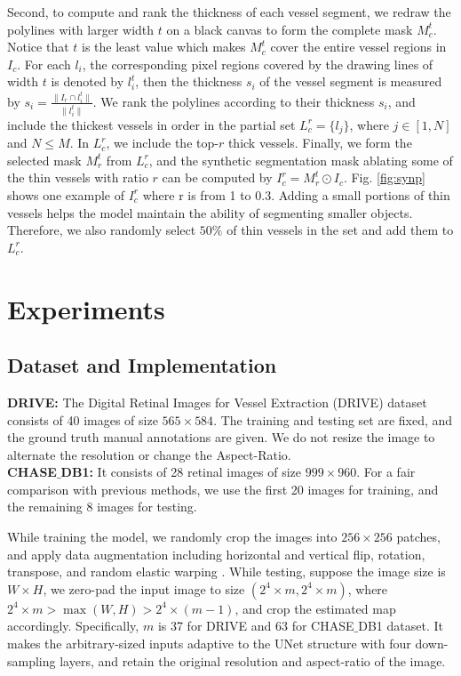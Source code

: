 \documentclass[runningheads]{llncs}
\begin{document}
Second, to compute and rank the thickness of each vessel segment, we redraw the polylines with larger width $t$ on a black canvas to form the complete mask $M_c^t$. Notice that $t$ is the least value which makes $M_c^t$ cover the entire vessel regions in $I_c$. For each $l_i$, the corresponding pixel regions covered by the drawing lines of width $t$ is denoted by $l_i^t$, then the thickness $s_i$ of the vessel segment is measured by $s_i = \frac{\|I_r \cap l_i^t\|}{\|l_i^t\|}$. We rank the polylines according to their thickness $s_i$, and include the thickest vessels in order in the partial set $L_c^r = \{l_j\}$, where $j \in [1, N]$ and $N\leq M$. In $L_c^r$, we include the top-$r$ thick vessels. Finally, we form the selected mask $M_r^t$ from $L_c^r$, and the synthetic segmentation mask ablating some of the thin vessels with ratio $r$ can be computed by $I_c^r = M_r^t \odot I_c$. Fig. \ref{fig:synp} shows one example of $I_c^r$ where r is from 1 to 0.3. Adding a small portions of thin vessels helps the model maintain the ability of segmenting smaller objects. Therefore, we also randomly select $50 \%$ of thin vessels in the set and add them to $L_c^r$. 
\section{Experiments}
\subsection{Dataset and Implementation}
\textbf{DRIVE:} The Digital Retinal Images for Vessel Extraction (DRIVE) \cite{staal2004ridge} dataset consists of 40 images of size $565 \times 584$. The training and testing set are fixed, and the ground truth manual annotations are given. We do not resize the image to alternate the resolution or change the Aspect-Ratio.\\
\textbf{CHASE$\_$DB1:} \cite{fraz2012ensemble} It consists of 28 retinal images of size $999 \times 960$. For a fair comparison with previous methods, we use the first 20 images for training, and the remaining 8 images for testing.

While training the model, we randomly crop the images into $256 \times 256$ patches, and apply data augmentation including horizontal and vertical flip, rotation, transpose, and random elastic warping \cite{simard2003best}. While testing, suppose the image size is $W \times H$, we zero-pad the input image to size $(2^4\times m, 2^4\times m)$, where $2^4 \times m > \max(W, H) > 2^4 \times {(m-1)} $, and crop the estimated map accordingly. Specifically, $m$ is 37 for DRIVE and 63 for CHASE$\_$DB1 dataset. It makes the arbitrary-sized inputs adaptive to the UNet structure with four down-sampling layers, and retain the original resolution and aspect-ratio of the image. 
\end{document}
